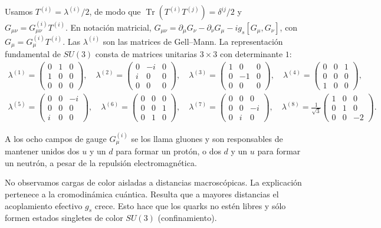 \documentclass[11pt,a4paper]{article}
\newcommand{\concept}[1]{\textcolor{concept-green}{#1}}
\newcommand{\Tr}{\operatorname{Tr}}
\begin{document}
Usamos $T^{(i)}=\lambda^{(i)}/2$, de modo que
$\Tr(T^{(i)}T^{(j)})=\delta^{ij}/2$ y
$G_{\mu\nu}=G_{\mu\nu}^{(i)}T^{(i)}$.
En notación matricial,
$G_{\mu\nu}=\partial_\mu G_\nu-\partial_\nu G_\mu-ig_s[G_\mu,G_\nu]$,
con $G_\mu=G_\mu^{(i)}T^{(i)}$.
Las $\lambda^{(i)}$ son las matrices de Gell--Mann. La representación
fundamental de $SU(3)$ consta de matrices unitarias $3\times3$
con determinante $1$:
\[
\begin{gathered}
  \lambda^{(1)}=
  \begin{pmatrix}0&1&0\\1&0&0\\0&0&0\end{pmatrix},
  \quad
  \lambda^{(2)}=
  \begin{pmatrix}0&-i&0\\i&0&0\\0&0&0\end{pmatrix},
  \quad
  \lambda^{(3)}=
  \begin{pmatrix}1&0&0\\0&-1&0\\0&0&0\end{pmatrix},
  \quad
  \lambda^{(4)}=
  \begin{pmatrix}0&0&1\\0&0&0\\1&0&0\end{pmatrix},\\[0.8em]
  \lambda^{(5)}=
  \begin{pmatrix}0&0&-i\\0&0&0\\i&0&0\end{pmatrix},
  \quad
  \lambda^{(6)}=
  \begin{pmatrix}0&0&0\\0&0&1\\0&1&0\end{pmatrix},
  \quad
  \lambda^{(7)}=
  \begin{pmatrix}0&0&0\\0&0&-i\\0&i&0\end{pmatrix},
  \quad
  \lambda^{(8)}=
  \frac1{\sqrt3}
  \begin{pmatrix}1&0&0\\0&1&0\\0&0&-2\end{pmatrix}.
\end{gathered}
\]

A los ocho campos de gauge $G_\mu^{(i)}$ se los llama \concept{gluones} y son
responsables de mantener unidos dos $u$ y un $d$ para formar un protón, o dos
$d$ y un $u$ para formar un neutrón, a pesar de la repulsión electromagnética.

No observamos cargas de color aisladas a distancias macroscópicas.
La explicación pertenece a la \concept{cromodinámica cuántica}. Resulta que a mayores distancias el
acoplamiento efectivo $g_s$ crece. Esto hace que los quarks no estén libres y sólo formen
estados singletes de color $SU(3)$ (confinamiento).
\end{document}
